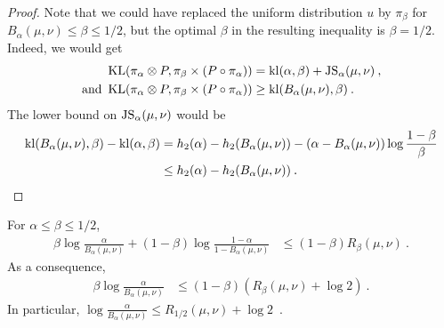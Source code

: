 \begin{proof}
Note that we could have replaced the uniform distribution $u$ by $\pi_\beta$ for $B_\alpha(\mu, \nu) \le \beta \le 1/2$, but the optimal $\beta$ in the resulting inequality is $\beta = 1/2$. Indeed, we would get
\begin{align*}
\operatorname{KL}(\pi_\alpha \otimes P, \pi_\beta \times (P \circ \pi_\alpha))
&= \operatorname{kl}(\alpha, \beta) + \operatorname{JS}_\alpha(\mu, \nu)
\: , \\
\text{and }
\operatorname{KL}(\pi_\alpha \otimes P, \pi_\beta \times (P \circ \pi_\alpha))
&\ge \operatorname{kl}(B_\alpha(\mu, \nu), \beta)
\: .
\end{align*}
The lower bound on $\operatorname{JS}_\alpha(\mu, \nu)$ would be
\begin{align*}
\operatorname{kl}(B_\alpha(\mu, \nu), \beta) - \operatorname{kl}(\alpha, \beta)
&= h_2(\alpha) - h_2(B_\alpha(\mu, \nu)) - (\alpha - B_\alpha(\mu, \nu)) \log \frac{1 - \beta}{\beta}
\\
&\le h_2(\alpha) - h_2(B_\alpha(\mu, \nu)) \: .
\end{align*}

\end{proof}


\begin{lemma}
  \label{lem:log_inv_bayesBinaryRisk_le_renyi}
  For $\alpha \le \beta \le 1/2$,
  \begin{align*}
  \beta \log\frac{\alpha}{B_\alpha(\mu, \nu)} + (1 - \beta) \log\frac{1 - \alpha}{1 - B_\alpha(\mu, \nu)}
  &\le (1 - \beta) R_{\beta}(\mu, \nu)
  \: .
  \end{align*}
  As a consequence,
  \begin{align*}
  \beta \log\frac{\alpha}{B_\alpha(\mu, \nu)}
  &\le (1 - \beta) (R_{\beta}(\mu, \nu) + \log 2)
  \: .
  \end{align*}
  In particular, $\log\frac{\alpha}{B_\alpha(\mu, \nu)} \le R_{1/2}(\mu, \nu) + \log 2$~.
\end{lemma}


